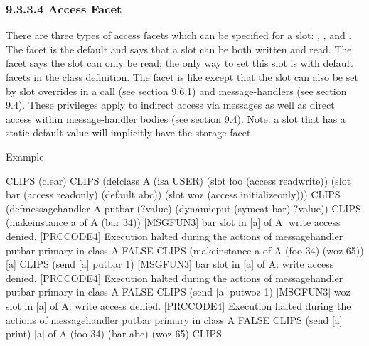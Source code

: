 \documentclass[letterpaper,10pt,english]{sphinxmanual}
\begin{document}
\subsubsection{9.3.3.4 Access Facet}
\label{\detokenize{cool:access-facet}}
There are three types of access facets which can be specified for a
slot: , , and . The
 facet is the default and says that a slot can be both
written and read. The  facet says the slot can only be
read; the only way to set this slot is with default facets in the class
definition. The  facet is like  except
that the slot can also be set by slot overrides in a 
call (see section 9.6.1) and  message-handlers (see section
9.4). These privileges apply to indirect access via messages as well as
direct access within message-handler bodies (see section 9.4). Note: a
 slot that has a static default value will implicitly have
the  storage facet.

Example

\begin{sphinxVerbatim}[commandchars=\\\{\}]
CLIPS\PYGZgt{} (clear)
CLIPS\PYGZgt{}
(defclass A (is\PYGZhy{}a USER)
  (slot foo (access read\PYGZhy{}write))
  (slot bar (access read\PYGZhy{}only) (default abc))
  (slot woz (access initialize\PYGZhy{}only)))
CLIPS\PYGZgt{}
(defmessage\PYGZhy{}handler A put\PYGZhy{}bar (?value)
  (dynamic\PYGZhy{}put (sym\PYGZhy{}cat bar) ?value))
CLIPS\PYGZgt{} (make\PYGZhy{}instance a of A (bar 34))
[MSGFUN3] bar slot in [a] of A: write access denied.
[PRCCODE4] Execution halted during the actions of message\PYGZhy{}handler
put\PYGZhy{}bar primary in class A
FALSE
CLIPS\PYGZgt{} (make\PYGZhy{}instance a of A (foo 34) (woz 65))
[a]
CLIPS\PYGZgt{} (send [a] put\PYGZhy{}bar 1)
[MSGFUN3] bar slot in [a] of A: write access denied.
[PRCCODE4] Execution halted during the actions of message\PYGZhy{}handler
put\PYGZhy{}bar primary in class A
FALSE
CLIPS\PYGZgt{} (send [a] put\PYGZhy{}woz 1)
[MSGFUN3] woz slot in [a] of A: write access denied.
[PRCCODE4] Execution halted during the actions of message\PYGZhy{}handler
put\PYGZhy{}bar primary in class A
FALSE
CLIPS\PYGZgt{} (send [a] print)
[a] of A
(foo 34)
(bar abc)
(woz 65)
CLIPS\PYGZgt{}
\end{sphinxVerbatim}
\end{document}
